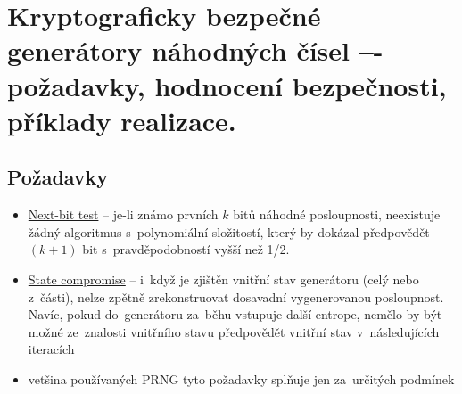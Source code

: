 \clearpage
\section{Kryptograficky bezpečné generátory náhodných čísel –- požadavky, hodnocení bezpečnosti, příklady realizace.}
\subsection{Požadavky}
\begin{itemize}
    \item \uline{Next-bit test} -- je-li známo prvních $k$ bitů náhodné posloupnosti, neexistuje žádný algoritmus s~polynomiální složitostí, který by dokázal předpovědět $(k + 1)$ bit s~pravděpodobností vyšší než 1/2.
    \item \uline{State compromise} -- i~když je zjištěn vnitřní stav generátoru (celý nebo z~části), nelze zpětně zrekonstruovat dosavadní vygenerovanou posloupnost. Navíc, pokud do~generátoru za~běhu vstupuje další entrope, nemělo by být možné ze~znalosti vnitřního stavu předpovědět vnitřní stav v~následujících iteracích
    \item vetšina používaných PRNG tyto požadavky splňuje jen za~určitých podmínek
\end{itemize}

